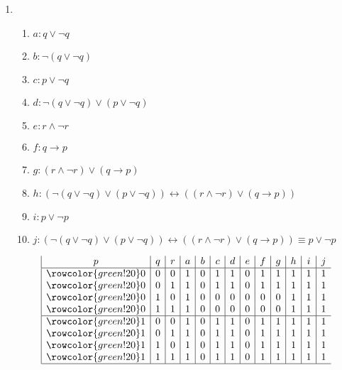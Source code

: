 \documentclass{article}
\begin{document}
\begin{enumerate}[label=(\alph*)]
\begin{enumerate}[label=\roman*.]
        \item 
        \begin{enumerate}[label={}]         
             \item $a: q\lor{}\neg{}q$
             \item $b: \neg{}(q\lor{}\neg{}q)$
             \item $c: p\lor{}\neg{}q$
             \item $d: \neg{}(q\lor{}\neg{}q)\lor{}(p\lor{}\neg{}q)$
             \item $e: r\land{}\neg{}r$
             \item $f: q\rightarrow{}p$
             \item $g: (r\land{}\neg{}r)\lor{}(q\rightarrow{}p)$
             \item $h: (\neg{}(q\lor{}\neg{}q)\lor{}(p\lor{}\neg{}q))\leftrightarrow{}((r\land{}\neg{}r)\lor{}(q\rightarrow{}p))$
             \item $i: p\lor{}\neg{}p$
             \item $j: (\neg{}(q\lor{}\neg{}q)\lor{}(p\lor{}\neg{}q))\leftrightarrow{}((r\land{}\neg{}r)\lor{}(q\rightarrow{}p))\equiv{}p\lor{}\neg{}p$
        \end{enumerate}
        \begin{displaymath}
            \begin{array}{|c|c|c|c|c|c|c|c|c|c|c|c|c}
               p & q & r & a & b & c & d & e & f & g & h & i & j\\
            \hline
            \rowcolor{green!20}
            0 & 0 & 0 & 1 & 0 & 1 & 1 & 0 & 1 & 1 & 1 & 1 & 1 \\
            \rowcolor{green!20}
            0 & 0 & 1 & 1 & 0 & 1 & 1 & 0 & 1 & 1 & 1 & 1 & 1 \\
            \rowcolor{green!20}
            0 & 1 & 0 & 1 & 0 & 0 & 0 & 0 & 0 & 0 & 1 & 1 & 1 \\
            \rowcolor{green!20}
            0 & 1 & 1 & 1 & 0 & 0 & 0 & 0 & 0 & 0 & 1 & 1 & 1 \\
            \hline
            \rowcolor{green!20}
            1 & 0 & 0 & 1 & 0 & 1 & 1 & 0 & 1 & 1 & 1 & 1 & 1 \\
            \rowcolor{green!20}
            1 & 0 & 1 & 1 & 0 & 1 & 1 & 0 & 1 & 1 & 1 & 1 & 1 \\
            \rowcolor{green!20}
            1 & 1 & 0 & 1 & 0 & 1 & 1 & 0 & 1 & 1 & 1 & 1 & 1 \\
            \rowcolor{green!20}
            1 & 1 & 1 & 1 & 0 & 1 & 1 & 0 & 1 & 1 & 1 & 1 & 1 \\
            \hline
            \end{array}
        \end{displaymath}
        

\end{enumerate}
\end{enumerate}
\end{document}

